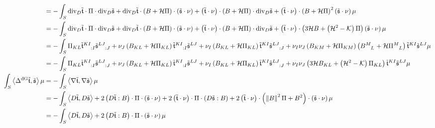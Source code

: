 \documentclass[a4paper,7pt]{scrartcl}
\newcommand{\gauss}{\mathcal{K}}
\newcommand{\mean}{\mathcal{H}}
\renewcommand{\div}{\mathrm{div}}
\newcommand{\laplace}[1]{\Delta^{#1}}
\newcommand{\ldivgrad}{\laplace{\textup{dG}}}
\newcommand{\pism}{\Pi}
\newcommand{\pissf}[2]{\tensor{\pism}{^{#1}_{#2}}}
\newcommand{\bsf}[2]{\tensor{B}{^{#1}_{#2}}}
\newcommand{\ints}[1]{\int_{S} #1 \mu}
\newcommand{\tsym}{\mathfrak{t}}
\newcommand{\ssym}{\mathfrak{s}}
\newcommand{\ttsym}{\tilde{\tsym}}
\newcommand{\tssym}{\tilde{\ssym}}
\begin{document}
\begin{align*}
        &= -\ints{\div_{D}\ttsym\cdot\pism\cdot\div_{D}\tssym 
                  +\div_{D}\ttsym\cdot\left(  B + \mean\pism  \right)\cdot\left( \tssym\cdot\nu \right)
                  +\left( \ttsym\cdot\nu \right)\cdot\left(  B + \mean\pism  \right)\cdot\div_{D}\tssym 
                  +\left( \ttsym\cdot\nu \right)\cdot\left(  B + \mean\pism  \right)^{2}\left( \tssym\cdot\nu \right)}\\
        &= -\ints{\div_{D}\ttsym\cdot\pism\cdot\div_{D}\tssym 
                  +\div_{D}\ttsym\cdot\left(  B + \mean\pism  \right)\cdot\left( \tssym\cdot\nu \right)
                  +\left( \ttsym\cdot\nu \right)\cdot\left(  B + \mean\pism  \right)\cdot\div_{D}\tssym 
                  +\left( \ttsym\cdot\nu \right)\cdot\left(  3\mean B + \left( \mean^{2} - \gauss \right)\pism  \right)\left( \tssym\cdot\nu \right)}\\
        &= -\ints{\pism_{KL} \tensor{\ttsym}{^{KI}_{:I}} \tensor{\tssym}{^{LJ}_{:J}}
                +\nu_{J} \left( B_{KL} + \mean \pism_{KL} \right) \tensor{\ttsym}{^{KI}_{:I}} \tssym^{LJ} 
                +\nu_{I} \left( B_{KL} + \mean \pism_{KL} \right) \ttsym^{KI} \tensor{\tssym}{^{LJ}_{:J}} 
                +\nu_{I} \nu_{J}\left( B_{KM} + \mean \pism_{KM} \right)\left( \bsf{M}{L} + \mean \pissf{M}{L} \right) \ttsym^{KI} \tssym^{LJ} }\\
        &= -\ints{\pism_{KL} \tensor{\ttsym}{^{KI}_{:I}} \tensor{\tssym}{^{LJ}_{:J}}
                +\nu_{J} \left( B_{KL} + \mean \pism_{KL} \right) \tensor{\ttsym}{^{KI}_{:I}} \tssym^{LJ} 
                +\nu_{I} \left( B_{KL} + \mean \pism_{KL} \right) \ttsym^{KI} \tensor{\tssym}{^{LJ}_{:J}} 
                +\nu_{I} \nu_{J}\left( 3\mean B_{KL} + \left( \mean^{2} - \gauss \right)\pism_{KL}  \right) \ttsym^{KI} \tssym^{LJ} }\\
    \ints{\left\langle \ldivgrad\ttsym , \tssym \right\rangle}
        &= -\ints{\left\langle \nabla\ttsym , \nabla\tssym \right\rangle}\\
        &= -\ints{\left\langle D\ttsym , D\tssym \right\rangle
                + 2 \left( D\ttsym : B \right) \cdot \pism \cdot \left( \tssym\cdot\nu \right)
                + 2 \left( \ttsym\cdot\nu \right) \cdot \pism \cdot \left( D\tssym : B \right) 
                + 2  \left( \ttsym\cdot\nu \right) \cdot \left( \left\| B \right\|^{2}\pism + B^{2} \right) \cdot \left( \tssym\cdot\nu \right) }\\
        &= -\ints{\left\langle D\ttsym , D\tssym \right\rangle
                + 2 \left( D\ttsym : B \right) \cdot \pism \cdot \left( \tssym\cdot\nu \right)
}
\end{align*}
\end{document}
